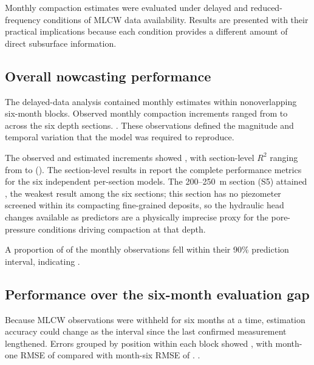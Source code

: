 Monthly compaction estimates were evaluated under delayed and reduced-frequency conditions of MLCW data availability. Results are presented with their practical implications because each condition provides a different amount of direct subsurface information.

\subsection{Overall nowcasting performance}
\label{subsec:results_delayed_nowcast}

The delayed-data analysis contained  monthly estimates within  nonoverlapping six-month blocks. Observed monthly compaction increments ranged from  to  across the six depth sections. . These observations defined the magnitude and temporal variation that the model was required to reproduce.

The observed and estimated increments showed , with section-level $R^2$ ranging from  to  (). The section-level results in  report the complete performance metrics for the six independent per-section models. The 200--250~m section (S5) attained , the weakest result among the six sections; this section has no piezometer screened within its compacting fine-grained deposits, so the hydraulic head changes available as predictors are a physically imprecise proxy for the pore-pressure conditions driving compaction at that depth.

A proportion of  of the monthly observations fell within their 90\% prediction interval, indicating .

\subsection{Performance over the six-month evaluation gap}
\label{subsec:results_gap_horizon}

Because MLCW observations were withheld for six months at a time, estimation accuracy could change as the interval since the last confirmed measurement lengthened. Errors grouped by position within each block showed , with month-one RMSE of  compared with month-six RMSE of . .

